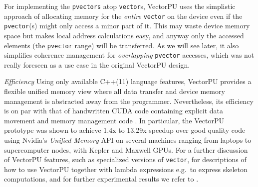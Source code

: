 For implementing the \texttt{pvectors} atop \texttt{vector}s, 
VectorPU uses the simplistic approach of allocating memory for
the \emph{entire} \texttt{vector} on the device 
even if the \texttt{pvector}(s) might only
access a minor part of it. This may waste device memory space 
but makes local address calculations easy, and anyway only
the accessed elements (the \texttt{pvector} range) will be transferred.
As we will see later, it also simplifies coherence management
for \emph{overlapping} \texttt{pvector} accesses, which was not 
really foreseen as a use case in the original VectorPU design.

\vspace{1.4mm}
\noindent
\textit{Efficiency }
Using only available C++(11) language features, 
VectorPU provides a flexible unified memory
view where all data transfer and device memory management
is abstracted away from the programmer. Nevertheless,
its efficiency is on par with that of handwritten CUDA code
containing explicit data movement and memory management code
\cite{VectorPU-2017}.
In particular, the VectorPU prototype was shown to
achieve 1.4x to 13.29x speedup over good quality
code using Nvidia's \textit{Unified Memory} API
on several machines ranging from laptops to supercomputer nodes,
with Kepler and Maxwell GPUs. For a further discussion of
VectorPU features, such as
specialized versions of \verb-vector-, for descriptions
of how to use VectorPU together with lambda expressions 
e.g.\ to express skeleton computations, and for further
experimental results 
we refer to \cite{VectorPU-2017}.
